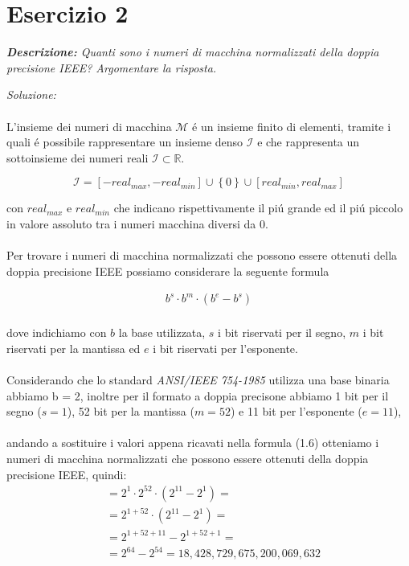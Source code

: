 \section{Esercizio 2}
\textit{\textbf{Descrizione:} Quanti sono i numeri di macchina normalizzati della doppia precisione IEEE? Argomentare la risposta.}\newline

\emph{Soluzione: }\\~\\
\noindent L'insieme dei numeri di macchina $\mathcal{M}$ \'e un insieme finito di elementi, tramite i quali \'e possibile rappresentare un insieme denso $\mathcal{I}$ e che rappresenta un sottoinsieme dei numeri reali  $\mathcal{I} \subset \mathbb{R}$.

\begin{equation}
	 \mathcal{I} = \left [ -real_{max}, -real_{min}\right ] \cup \left \{  0\right \} \cup \left [real_{min}, real_{max} \right]
\end{equation}

\noindent con $real_{max}$ e $real_{min}$ che indicano rispettivamente il pi\'u grande ed il pi\'u piccolo in valore assoluto tra i numeri macchina diversi da 0.
\\~\\
\noindent Per trovare i numeri di macchina normalizzati che possono essere ottenuti della doppia precisione IEEE possiamo considerare la seguente formula


\begin{equation}
  \begin{aligned}
      b^{s} \cdot b^{m} \cdot (b^{e} - b^{s})\\
  \end{aligned}
\end{equation}

\noindent dove indichiamo con $b$ la base utilizzata, $s$ i bit riservati per il segno, $m$ i bit riservati per la mantissa ed $e$ i bit riservati per l'esponente.
\\~\\
Considerando che lo standard \textit{ANSI/IEEE 754-1985} utilizza una base binaria abbiamo b = 2, inoltre per il formato a doppia precisone abbiamo 1 bit per il segno ($s=1$), 52 bit per la mantissa ($m=52$) e 11 bit per l'esponente ($e=11$),
\\~\\
andando a sostituire i valori appena ricavati nella formula (1.6) otteniamo i numeri di macchina normalizzati che possono essere ottenuti della doppia precisione IEEE, quindi:
\begin{equation}
  \begin{aligned}
      & =  2^{1} \cdot 2^{52} \cdot (2^{11} - 2^{1}) = \\
      & = 2^{1+52} \cdot (2^{11} - 2^{1}) = \\
      & = 2^{1+52+11} - 2^{1+52+1} = \\
      & = 2^{64} - 2^{54} = 18,428,729,675,200,069,632 
  \end{aligned}
\end{equation}
\newpage